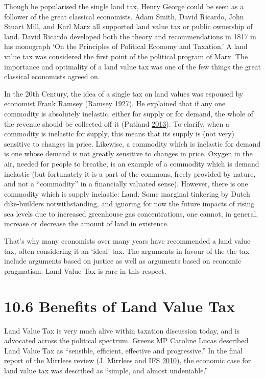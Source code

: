 \documentclass[]{tufte-handout}
\begin{document}
Though he popularised the single land tax, Henry George could be seen as
a follower of the great classical economists. Adam Smith, David Ricardo,
John Stuart Mill, and Karl Marx all supported land value tax or public
ownership of land. David Ricardo developed both the theory and
recommendations in 1817 in his monograph `On the Principles of Political
Economy and Taxation.' A land value tax was considered the first point
of the political program of Marx. The importance and optimality of a
land value tax was one of the few things the great classical economists
agreed on.

In the 20th Century, the idea of a single tax on land values was
espoused by economist Frank Ramsey (Ramsey
\protect\hyperlink{ref-Ramsey1927}{1927}). He explained that if any one
commodity is absolutely inelastic, either for supply or for demand, the
whole of the revenue should be collected off it (Putland
\protect\hyperlink{ref-Putland2013}{2013}). To clarify, when a commodity
is inelastic for supply, this means that its supply is (not very)
sensitive to changes in price. Likewise, a commodity which is inelastic
for demand is one whose demand is not greatly sensitive to changes in
price. Oxygen in the air, needed for people to breathe, is an example of
a commodity which is demand inelastic (but fortunately it is a part of
the commons, freely provided by nature, and not a ``commodity'' in a
financially valuated sense). However, there is one commodity which is
supply inelastic: Land. Some marginal tinkering by Dutch dike-builders
notwithstanding, and ignoring for now the future impacts of rising sea
levels due to increased greenhouse gas concentrations, one cannot, in
general, increase or decrease the amount of land in existence.

That's why many economists over many years have recommended a land value
tax, often considering it an `ideal' tax. The arguments in favour of the
the tax include arguments based on justice as well as arguments based on
economic pragmatism. Land Value Tax is rare in this respect.

\hypertarget{benefits-of-land-value-tax}{%
\section{10.6 Benefits of Land Value
Tax}\label{benefits-of-land-value-tax}}

Land Value Tax is very much alive within taxation discussion today, and
is advocated across the political spectrum. Greens MP Caroline Lucas
described Land Value Tax as ``sensible, efficient, effective and
progressive.'' In the final report of the Mirrlees review (J. Mirrlees
and IFS \protect\hyperlink{ref-Mirrlees2010}{2010}), the economic case
for land value tax was described as ``simple, and almost undeniable.''
\end{document}
